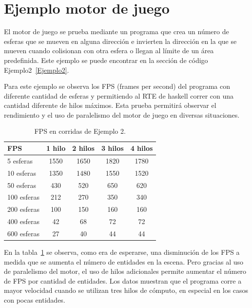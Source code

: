 \section{Ejemplo motor de juego}

El motor de juego se prueba mediante un programa que crea un número de esferas que se mueven en alguna dirección e invierten la dirección en la que se mueven cuando colisionan con otra esfera o llegan al límite de un área predefinida. Este ejemplo se puede encontrar en la sección de código Ejemplo2~\ref{Ejemplo2}.

Para este ejemplo se observa los FPS (frames per second) del programa con diferente cantidad de esferas y permitiendo al RTE de haskell correr con una cantidad diferente de hilos máximos. Esta prueba permitirá observar el rendimiento y el uso de paralelismo del motor de juego en diversas situaciones.

\begin{table}
\begin{tabular}{ | l | c | c | c | c | }
 \hline
 FPS & 1 hilo &2 hilos&3 hilos&4 hilos\\
 \hline
 5 esferas & 1550	& 1650	& 1820	& 1780 \\ \hline
 10 esferas & 1350	& 1480	& 1550	& 1520 \\ \hline
 50 esferas & 430	& 520	& 650	& 620 \\ \hline
 100 esferas & 212	& 270	& 350	& 340 \\ \hline
 200 esferas & 100	& 150	& 160	& 160 \\ \hline
 400 esferas & 42	& 68	& 72	& 72 \\ \hline
 600 esferas & 27	& 40	& 44	& 44 \\
 \hline
\end{tabular}
\caption{FPS en corridas de Ejemplo 2.}
\label{table:Ejemplo2}
\end{table}

En la tabla~\ref{table:Ejemplo2} se observa, como era de esperarse, una disminución de los FPS a medida que se aumenta el número de entidades en la escena. Pero gracias al uso de paralelismo del motor, el uso de hilos adicionales permite aumentar el número de FPS por cantidad de entidades. Los datos muestran que el programa corre a mayor velocidad cuando se utilizan tres hilos de cómputo, en especial en los casos con pocas entidades.

